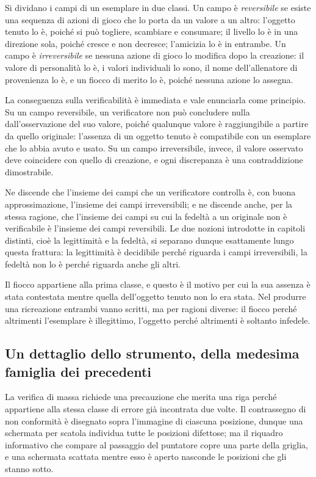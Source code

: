 Si dividano i campi di un esemplare in due classi. Un campo è \emph{reversibile} se esiste una sequenza di azioni di gioco che lo porta da un valore a un altro: l'oggetto tenuto lo è, poiché si può togliere, scambiare e consumare; il livello lo è in una direzione sola, poiché cresce e non decresce; l'amicizia lo è in entrambe. Un campo è \emph{irreversibile} se nessuna azione di gioco lo modifica dopo la creazione: il valore di personalità lo è, i valori individuali lo sono, il nome dell'allenatore di provenienza lo è, e un fiocco di merito lo è, poiché nessuna azione lo assegna.

La conseguenza sulla verificabilità è immediata e vale enunciarla come principio. Su un campo reversibile, un verificatore non può concludere nulla dall'osservazione del suo valore, poiché qualunque valore è raggiungibile a partire da quello originale: l'assenza di un oggetto tenuto è compatibile con un esemplare che lo abbia avuto e usato. Su un campo irreversibile, invece, il valore osservato deve coincidere con quello di creazione, e ogni discrepanza è una contraddizione dimostrabile.

Ne discende che l'insieme dei campi che un verificatore controlla è, con buona approssimazione, l'insieme dei campi irreversibili; e ne discende anche, per la stessa ragione, che l'insieme dei campi su cui la fedeltà a un originale non è verificabile è l'insieme dei campi reversibili. Le due nozioni introdotte in capitoli distinti, cioè la legittimità e la fedeltà, si separano dunque esattamente lungo questa frattura: la legittimità è decidibile perché riguarda i campi irreversibili, la fedeltà non lo è perché riguarda anche gli altri.

Il fiocco appartiene alla prima classe, e questo è il motivo per cui la sua assenza è stata contestata mentre quella dell'oggetto tenuto non lo era stata. Nel produrre una ricreazione entrambi vanno scritti, ma per ragioni diverse: il fiocco perché altrimenti l'esemplare è illegittimo, l'oggetto perché altrimenti è soltanto infedele.

\subsection*{Un dettaglio dello strumento, della medesima famiglia dei precedenti}

La verifica di massa richiede una precauzione che merita una riga perché appartiene alla stessa classe di errore già incontrata due volte. Il contrassegno di non conformità è disegnato sopra l'immagine di ciascuna posizione, dunque una schermata per scatola individua tutte le posizioni difettose; ma il riquadro informativo che compare al passaggio del puntatore copre una parte della griglia, e una schermata scattata mentre esso è aperto nasconde le posizioni che gli stanno sotto.

